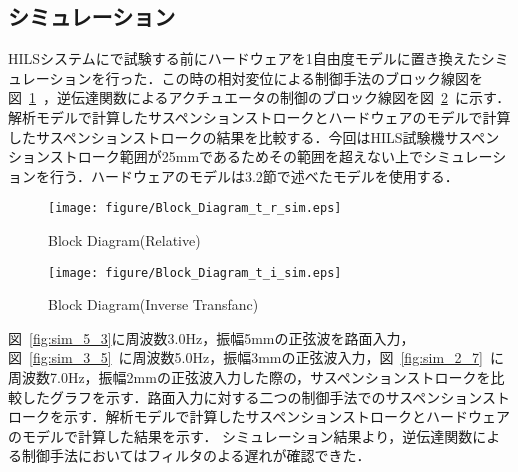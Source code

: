 \documentclass[a4paper,12pt]{article_vdlab_sotsuron}
\begin{document}
\subsection{シミュレーション}
HILSシステムにで試験する前にハードウェアを1自由度モデルに置き換えたシミュレーションを行った．この時の相対変位による制御手法のブロック線図を図~\ref{fig:sim_rel}~，逆伝達関数によるアクチュエータの制御のブロック線図を図~\ref{fig:sim_inv}~に示す．解析モデルで計算したサスペンションストロークとハードウェアのモデルで計算したサスペンションストロークの結果を比較する．今回はHILS試験機サスペンションストローク範囲が25mmであるためその範囲を超えない上でシミュレーションを行う．ハードウェアのモデルは3.2節で述べたモデルを使用する．

\vspace*{10mm}
\begin{figure}[htp]
  \begin{center}
    \texttt{[image: figure/Block\_Diagram\_t\_r\_sim.eps]}
    \vspace*{3mm}
    \caption{Block Diagram(Relative)}
    \label{fig:sim_rel}
  \end{center}
\end{figure}
\vspace*{10mm}
\begin{figure}[htp]
  \begin{center}
    \texttt{[image: figure/Block\_Diagram\_t\_i\_sim.eps]}
    \vspace*{3mm}
    \caption{Block Diagram(Inverse Transfanc)}
    \label{fig:sim_inv}
  \end{center}
\end{figure}

\newpage
図~\ref{fig:sim_5_3}に周波数3.0Hz，振幅5mmの正弦波を路面入力，図~\ref{fig:sim_3_5}~に周波数5.0Hz，振幅3mmの正弦波入力，図~\ref{fig:sim_2_7}~に周波数7.0Hz，振幅2mmの正弦波入力した際の，サスペンションストロークを比較したグラフを示す．路面入力に対する二つの制御手法でのサスペンションストロークを示す．解析モデルで計算したサスペンションストロークとハードウェアのモデルで計算した結果を示す．
シミュレーション結果より，逆伝達関数による制御手法においてはフィルタのよる遅れが確認できた．
\end{document}
